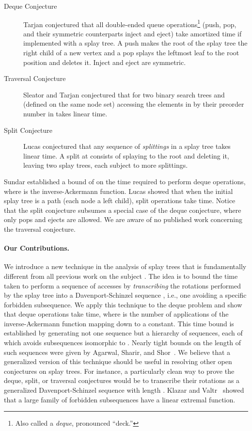 \documentclass{article}
\begin{document}
\begin{description}
\item[Deque Conjecture] Tarjan \cite{Tar85} conjectured that all double-ended queue operations\footnote{Also called a {\em deque}, pronounced ``deck.''} 
(push, pop, and their symmetric counterparts
inject and eject) take  amortized time if implemented with a splay tree.  A push makes the root of the splay tree the right child of a new vertex
and a pop splays the leftmost leaf to the root position and deletes it.  Inject and eject are symmetric.

\item[Traversal Conjecture] Sleator and Tarjan \cite{ST85} conjectured that for two binary search trees  and  (defined on the same node set)
accessing the elements in  by their preorder number in  takes linear time.

\item[Split Conjecture] Lucas conjectured \cite{Lucas91} 
that any sequence of {\em splittings} in a splay tree takes linear time.  A split at  consists of splaying
 to the root and deleting it, leaving two splay trees, each subject to more splittings.
\end{description}

Sundar \cite{Sundar92} established a bound of  on the time required to perform  deque operations, 
where  is the inverse-Ackermann function.  
Lucas \cite{Lucas91} showed that when the initial splay tree is a path (each node a left child), 
 split operations take  time.  Notice that the split conjecture subsumes
a special case of the deque conjecture, where only pops and ejects are allowed.  We are aware of no published 
work concerning the traversal conjecture.

\paragraph{Our Contributions.}
We introduce a new technique in the analysis of splay trees that is fundamentally
different from all previous work on the subject \cite{ST85,Tar85,Sundar92,ColeEtal00,Cole00,Georg04,Elmasry04b}.
The idea is to bound the time taken to perform a sequence of accesses by 
{\em transcribing} the rotations performed by the splay tree into a Davenport-Schinzel sequence , i.e.,
one avoiding a specific forbidden subsequence.  We apply this technique to the deque problem
and show that  deque operations take  time, 
where  is the number of applications of the inverse-Ackermann
function mapping  down to a constant.  This time bound is established by generating 
not one sequence  but a hierarchy of sequences, each of which avoids subsequences isomorphic
to .  Nearly tight bounds on the length of such sequences were given by 
Agarwal, Sharir, and Shor~\cite{ASS89}.  
We believe that a generalized version of this technique should be useful
in resolving other open conjectures on splay trees.  For instance, a particularly clean
way to prove the deque, split, or traversal conjectures would be to transcribe their
rotations as a generalized Davenport-Schinzel sequence with length .
Klazar and Valtr~\cite{KV94} showed that a large family of forbidden subsequences have
a linear extremal function.
\end{document}
